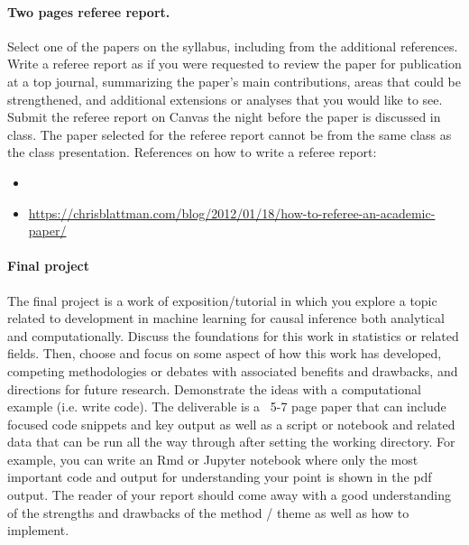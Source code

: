 \documentclass[letterpaper, 12pt, parskip=full,DIV=10]{scrartcl}
\begin{document}
\paragraph{Two pages referee report.}
Select one of the papers on the syllabus, including from the additional references. Write a referee report as if you were requested to review the paper for publication at a top journal, summarizing the paper's main contributions, areas that could be strengthened, and additional extensions or analyses that you would like to see. Submit the referee report on Canvas the night before the paper is discussed in class. The paper selected for the referee report cannot be from the same class as the class presentation. 
References on how to write a referee report:
\begin{itemize}
\item {}
 \item \url{https://chrisblattman.com/blog/2012/01/18/how-to-referee-an-academic-paper/}
 \end{itemize}

\paragraph{Final project}
The final project is a work of exposition/tutorial in which you explore a topic related to development in machine learning for causal inference both analytical and computationally.  Discuss the foundations for this work in statistics or related fields. Then, choose and focus on some aspect of how this work has developed, competing methodologies or debates with associated benefits and drawbacks, and directions for future research. Demonstrate the ideas with a computational example (i.e. write code). The deliverable is a ~5-7 page paper that can include focused code snippets and key output as well as a script or notebook and related data that can be run all the way through after setting the working directory. For example, you can write an Rmd or Jupyter notebook where only the most important code and output for understanding your point is shown in the pdf output.  The reader of your report should come away with a good understanding of the strengths and drawbacks of the method / theme as well as how to implement.
\end{document}
